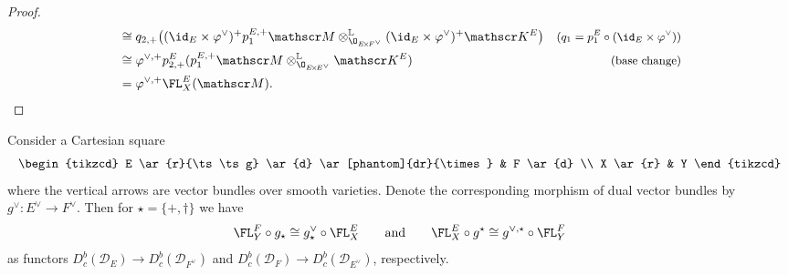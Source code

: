 \begin{proof}
\begin{align*}
&\cong q_{2,+} \big((\id_E \times \varphi^\vee)^+ p_1^{E,+} \mathscr M \otimes^{\mathbb L}_{\O_{E\!\times\!F^\vee}} (\id_E \times \varphi^\vee)^+ \mathscr K^E\big) & \text{\small ($q_1 = p_1^E \circ (\id_E \times \varphi^\vee)$)}\\
&\cong \varphi^{\vee,+} p^E_{2,+} (p_1^{E,+} \mathscr M \otimes^{\mathbb L}_{\O_{E\!\times\!E^\vee}} \mathscr K^E) & \text{\small (base change)}\\
&= \varphi^{\vee,+} \FL_X^E(\mathscr M). & \qedhere
\end{align*}
\end{proof}

\begin{lem} \label{lem:FLCartesian}
Consider a Cartesian square\vspace*{-5pt}\enlargethispage{1.5\baselineskip}
\[
\begin{tikzcd}
E \ar{r}{\ts \ts g} \ar{d} \ar[phantom]{dr}{\times} & F \ar{d} \\
X \ar{r} & Y
\end{tikzcd}
\]
where the vertical arrows are vector bundles over smooth varieties. Denote the corresponding morphism of dual vector bundles by $g^\vee \colon E^\vee \to F^\vee$. Then for
$\star=\{+,\dag\}$ we have\vspace*{-5pt}
\[
\FL_Y^F \circ g_\star \cong g^\vee_\star \circ \FL_X^E \qquad \text{and} \qquad
\FL_X^E \circ g^\star \cong g^{\vee,\star} \circ \FL_Y^F
\]
as functors $D_{c}^b(\mathscr D_E) \to D_{c}^b(\mathscr D_{F^\vee})$ and $D_{c}^b(\mathscr D_F) \to D_{c}^b(\mathscr D_{E^\vee})$, respectively.
\end{lem}

